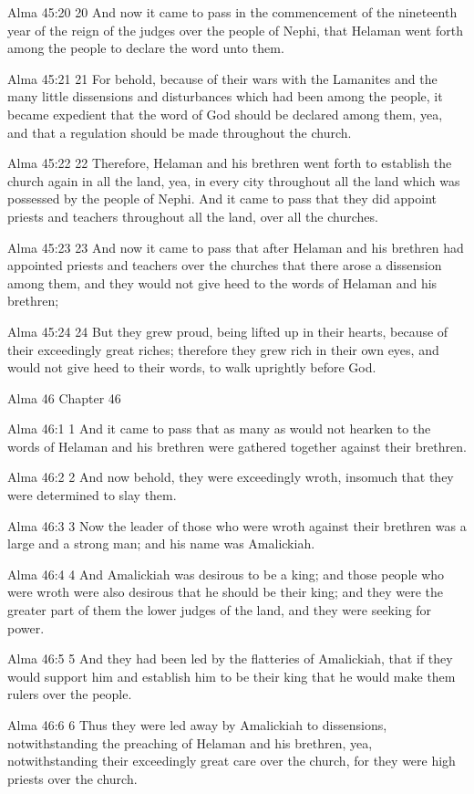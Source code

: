 Alma 45:20
 20 And now it came to pass in the commencement of the nineteenth
year of the reign of the judges over the people of Nephi, that
Helaman went forth among the people to declare the word unto
them.

Alma 45:21
 21 For behold, because of their wars with the Lamanites and the
many little dissensions and disturbances which had been among the
people, it became expedient that the word of God should be
declared among them, yea, and that a regulation should be made
throughout the church.

Alma 45:22
 22 Therefore, Helaman and his brethren went forth to establish
the church again in all the land, yea, in every city throughout
all the land which was possessed by the people of Nephi. And it
came to pass that they did appoint priests and teachers
throughout all the land, over all the churches.

Alma 45:23
 23 And now it came to pass that after Helaman and his brethren
had appointed priests and teachers over the churches that there
arose a dissension among them, and they would not give heed to
the words of Helaman and his brethren;

Alma 45:24
 24 But they grew proud, being lifted up in their hearts, because
of their exceedingly great riches; therefore they grew rich in
their own eyes, and would not give heed to their words, to walk
uprightly before God.

Alma 46
Chapter 46

Alma 46:1
 1 And it came to pass that as many as would not hearken to the
words of Helaman and his brethren were gathered together against
their brethren.

Alma 46:2
 2 And now behold, they were exceedingly wroth, insomuch that
they were determined to slay them.

Alma 46:3
 3 Now the leader of those who were wroth against their brethren
was a large and a strong man; and his name was Amalickiah.

Alma 46:4
 4 And Amalickiah was desirous to be a king; and those people who
were wroth were also desirous that he should be their king; and
they were the greater part of them the lower judges of the land,
and they were seeking for power.

Alma 46:5
 5 And they had been led by the flatteries of Amalickiah, that if
they would support him and establish him to be their king that he
would make them rulers over the people.

Alma 46:6
 6 Thus they were led away by Amalickiah to dissensions,
notwithstanding the preaching of Helaman and his brethren, yea,
notwithstanding their exceedingly great care over the church, for
they were high priests over the church.

